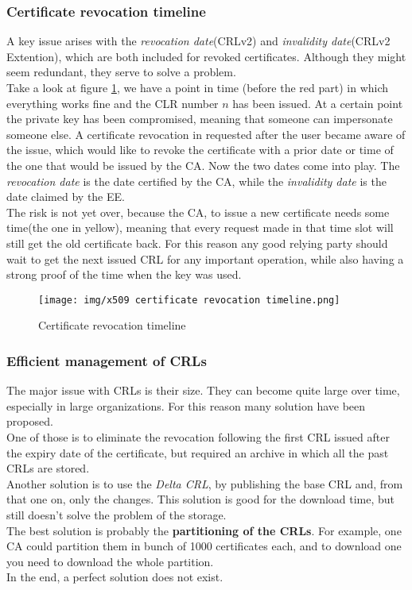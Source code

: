 \subsubsection{Certificate revocation timeline}
A key issue arises with the \textit{revocation date}(CRLv2) and
\textit{invalidity date}(CRLv2 Extention), which are both included for
revoked certificates. Although they might seem redundant, they serve
to solve a problem.\\
Take a look at figure \ref{fig:certificate revocation timeline}, we
have a point in time (before the red part) in which everything works
fine and the CLR number $n$ has been issued. At a certain point the
private key has been compromised, meaning that someone can impersonate
someone else. A certificate revocation in requested after the user
became aware of the issue, which would like to revoke the certificate
with a prior date or time of the one that would be issued by the CA.
Now the two dates come into play. The \textit{revocation date} is the 
date certified by the CA, while the \textit{invalidity date} is the 
date claimed by the EE.\\
The risk is not yet over, because the CA, to issue a new certificate
needs some time(the one in yellow), meaning that every request made 
in that time slot will still get the old certificate back. For this
reason any good relying party should wait to get the next issued CRL
for any important operation, while also having a strong proof of the
time when the key was used.

\begin{figure}[H]
  \centering
  \texttt{[image: img/x509 certificate
  revocation timeline.png]}

  \caption{Certificate revocation timeline}
  \label{fig:certificate revocation timeline}
\end{figure}
\subsubsection{Efficient management of CRLs}
The major issue with CRLs is their size. They can become quite large
over time, especially in large organizations. For this reason many
solution have been proposed.\\
One of those is to eliminate the revocation following the first CRL
issued after the expiry date of the certificate, but required an
archive in which all the past CRLs are stored.\\
Another solution is to use the \textit{Delta CRL}, by publishing the
base CRL and, from that one on, only the changes. This solution is
good for the download time, but still doesn't solve the problem of the 
storage.\\
The best solution is probably the \textbf{partitioning of the CRLs}.
For example, one CA could partition them in bunch of 1000 certificates 
each, and to download one you need to download the whole partition.\\
In the end, a perfect solution does not exist.

